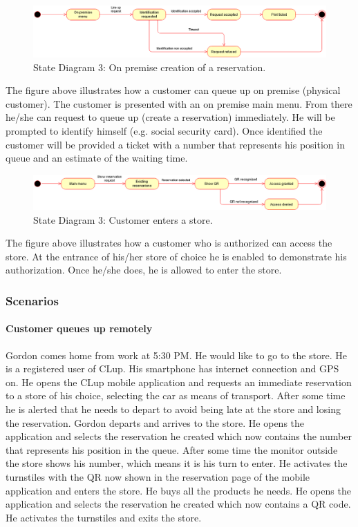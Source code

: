 \begin{figure}[!htb]
	\centering
	\includegraphics[width=\textwidth]{Images/StateDiagram3.png}
	\caption{State Diagram 3: On premise creation of a reservation.}
\end{figure}
The figure above illustrates how a customer can queue up on premise (physical customer). The customer is presented with an on premise main menu. From there he/she can request to queue up (create a reservation) immediately. He will be prompted to identify himself (e.g. social security card). Once identified the customer will be provided a ticket with a number that represents his position in queue and an estimate of the waiting time.

\begin{figure}[!htb]
	\centering
	\includegraphics[width=\textwidth]{Images/StateDiagram4.png}
	\caption{State Diagram 3: Customer enters a store.}
\end{figure}
The figure above illustrates how a customer who is authorized can access the store. At the entrance of his/her store of choice he is enabled to demonstrate his authorization. Once he/she does, he is allowed to enter the store.

\subsubsection{Scenarios}
\paragraph{Customer queues up remotely}
Gordon comes home from work at 5:30 PM. He would like to go to the store. He is a registered user of CLup. His smartphone has internet connection and GPS on. He opens the CLup mobile application and requests an immediate reservation to a store of his choice, selecting the car as means of transport. After some time he is alerted that he needs to depart to avoid being late at the store and losing the reservation. Gordon departs and arrives to the store. He opens the application and selects the reservation he created which now contains the number that represents his position in the queue. After some time the monitor outside the store shows his number, which means it is his turn to enter. He activates the turnstiles with the QR now shown in the reservation page of the mobile application and enters the store. He buys all the products he needs. He opens the application and selects the reservation he created which now contains a QR code. He activates the turnstiles and exits the store.
